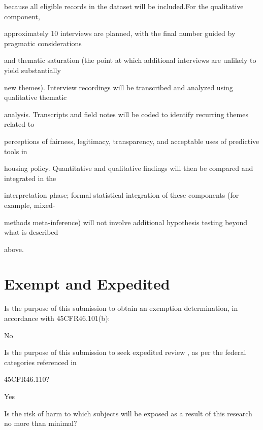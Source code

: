 \documentclass[10pt, letterpaper]{article}
\begin{document}
because all eligible records in the dataset will be included.For the qualitative component,

approximately 10 interviews are planned, with the final number guided by pragmatic considerations

and thematic saturation (the point at which additional interviews are unlikely to yield substantially

new themes). Interview recordings will be transcribed and analyzed using qualitative thematic

analysis. Transcripts and field notes will be coded to identify recurring themes related to

perceptions of fairness, legitimacy, transparency, and acceptable uses of predictive tools in

housing policy. Quantitative and qualitative findings will then be compared and integrated in the

interpretation phase; formal statistical integration of these components (for example, mixed-

methods meta-inference) will not involve additional hypothesis testing beyond what is described

above.

\vspace{0.5em}

\vspace{0.5em}

\section*{Exempt and Expedited}

\vspace{0.5em}

Is the purpose of this submission to obtain an exemption determination, in accordance with 45CFR46.101(b):

No

\vspace{0.5em}

\vspace{0.5em}

Is the purpose of this submission to seek expedited review , as per the federal categories referenced in

45CFR46.110?

Yes

\begin{responsebox}

Is the risk of harm to which subjects will be exposed as a result of this research no more than minimal?

\vspace{0.5em}

\vspace{0.5em}

\end{responsebox}
\end{document}
